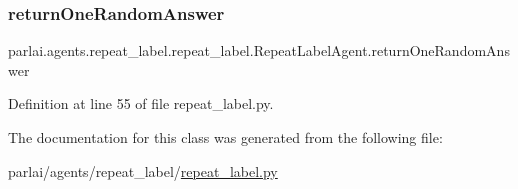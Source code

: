 \subsubsection{\texorpdfstring{return\+One\+Random\+Answer}{returnOneRandomAnswer}}
{\footnotesize\ttfamily parlai.\+agents.\+repeat\+\_\+label.\+repeat\+\_\+label.\+Repeat\+Label\+Agent.\+return\+One\+Random\+Answer}



Definition at line 55 of file repeat\+\_\+label.\+py.



The documentation for this class was generated from the following file\+:\begin{DoxyCompactItemize}
\item 
parlai/agents/repeat\+\_\+label/\hyperlink{repeat__label_8py}{repeat\+\_\+label.\+py}\end{DoxyCompactItemize}
